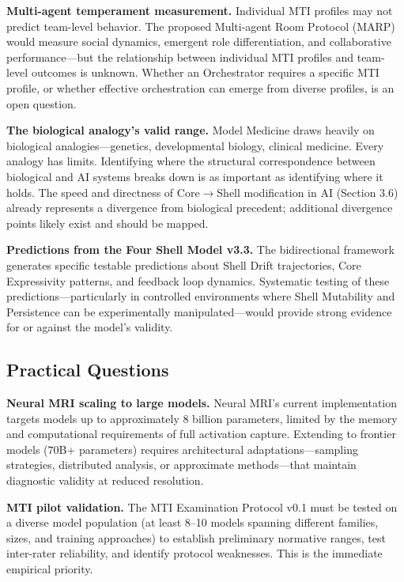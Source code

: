 \documentclass[11pt]{article}
\begin{document}
\textbf{Multi-agent temperament measurement.} Individual MTI profiles may not predict team-level behavior. The proposed Multi-agent Room Protocol (MARP) would measure social dynamics, emergent role differentiation, and collaborative performance---but the relationship between individual MTI profiles and team-level outcomes is unknown. Whether an Orchestrator requires a specific MTI profile, or whether effective orchestration can emerge from diverse profiles, is an open question.

\textbf{The biological analogy's valid range.} Model Medicine draws heavily on biological analogies---genetics, developmental biology, clinical medicine. Every analogy has limits. Identifying where the structural correspondence between biological and AI systems breaks down is as important as identifying where it holds. The speed and directness of Core$\rightarrow$Shell modification in AI (Section 3.6) already represents a divergence from biological precedent; additional divergence points likely exist and should be mapped.

\textbf{Predictions from the Four Shell Model v3.3.} The bidirectional framework generates specific testable predictions about Shell Drift trajectories, Core Expressivity patterns, and feedback loop dynamics. Systematic testing of these predictions---particularly in controlled environments where Shell Mutability and Persistence can be experimentally manipulated---would provide strong evidence for or against the model's validity.

\subsection{Practical Questions}

\textbf{Neural MRI scaling to large models.} Neural MRI's current implementation targets models up to approximately 8 billion parameters, limited by the memory and computational requirements of full activation capture. Extending to frontier models ($70$B+ parameters) requires architectural adaptations---sampling strategies, distributed analysis, or approximate methods---that maintain diagnostic validity at reduced resolution.

\textbf{MTI pilot validation.} The MTI Examination Protocol v0.1 must be tested on a diverse model population (at least 8--10 models spanning different families, sizes, and training approaches) to establish preliminary normative ranges, test inter-rater reliability, and identify protocol weaknesses. This is the immediate empirical priority.
\end{document}
